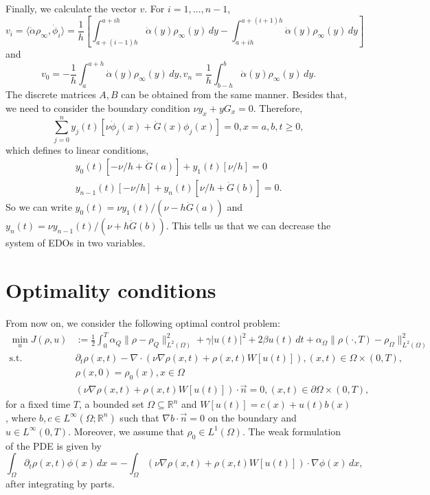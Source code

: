 \documentclass[12pt]{article}
\newcommand{\R}{\mathbb{R}}
\newcommand{\n}{\vec{n}}
\newcommand{\steady}{\rho_{\infty}}
\newcommand{\inner}[2]{\langle{} #1, #2 \rangle{}}
\theoremstyle{definition}
\begin{document}
Finally, we calculate the vector $v$.
For $i=1,\dots,n-1$,
\[
v_i = \inner{\dot\alpha \steady}{\dot{\phi}_i} = \frac{1}{h}\left[\int_{a+(i-1)h}^{a+ih} \dot\alpha(y) \steady(y)  \, dy- \int_{a+ih}^{a+(i+1)h} \dot\alpha(y) \steady(y) \, dy \right]    
\]
and 
\[
v_0 = -\frac{1}{h} \int_a^{a+h} \dot\alpha(y) \steady(y)  \, dy, v_n = \frac{1}{h} \int_{b-h}^{b} \dot\alpha(y) \steady(y)  \, dy.
\]
The discrete matrices $A, B$ can be obtained from the same manner. 
Besides that, we need to consider the boundary condition $\nu y_x + y G_x = 0$.
Therefore, 
\[
\sum_{j=0}^{n} y_j(t) \left[\nu\dot\phi_j(x) + \dot{G}(x) \phi_j(x)\right] = 0, x=a,b, t \ge 0, 
\]
which defines to linear conditions, 
\begin{gather*}
    y_0(t) \left[-\nu/h + \dot{G}(a)\right] + y_1(t) \left[\nu/h\right] = 0 \\
    y_{n-1}(t) \left[-\nu/h\right] + y_n(t) \left[\nu/h + \dot{G}(b)\right] = 0.
\end{gather*}
So we can write $y_0(t) = \nu y_1(t)/(\nu-h\dot{G}(a))$ and $y_n(t) = \nu y_{n-1}(t) / (\nu + h\dot{G}(b))$.
This tells us that we can decrease the system of EDOs in two variables. 

\section{Optimality conditions}

From now on, we consider the following optimal control problem:
\begin{align}
    \label{eq:cost_functional_fp}
    \min_u J(\rho, u) &:= \frac{1}{2}\int_0^T \alpha_Q\|\rho - \rho_Q\|^2_{L^2(\Omega)} + \gamma |u(t)|^2 + 2\beta u(t) \, dt + \alpha_{\Omega} \|\rho(\cdot, T) - \rho_{\Omega}\|^2_{L^2(\Omega)} \\
    \text{s.t. } &\partial_t \rho(x,t) - \nabla \cdot (\nu \nabla \rho(x,t) + \rho(x,t) W[u(t)]), (x,t) \in \Omega \times (0,T), \\
    &\rho(x,0) = \rho_0(x), x \in \Omega \\
    &(\nu \nabla \rho(x,t) + \rho(x,t) W[u(t)]) \cdot \n = 0, (x,t) \in \partial \Omega \times (0,T),
\end{align}
for a fixed time $T$, a bounded set $\Omega \subseteq \R^n$ and $W[u(t)] = c(x) + u(t) b(x)$, where $b,c \in L^{\infty}(\Omega; \R^n)$ such that $\nabla b \cdot \n = 0$ on the boundary and $u \in L^{\infty}(0,T)$.
Moreover, we assume that $\rho_0 \in L^1(\Omega)$. 
The weak formulation of the PDE is given by 
\begin{equation}
    \label{eq:fp_equation_weak}
    \int_{\Omega} \partial_t \rho(x,t) \phi(x) \, dx = -\int_{\Omega} (\nu \nabla \rho(x,t) + \rho(x,t) W[u(t)]) \cdot \nabla \phi(x) \, dx,
\end{equation}
after integrating by parts. 
\end{document}
